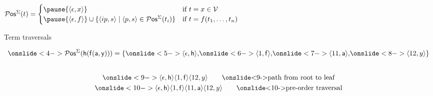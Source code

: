

\begin{definition}
$
	\Pos^\Sigma(t) =  
	\begin{cases}
\pause		\{ \ANGLES{\epsilon,x} \} & \text{if }t=x\in\SIGV \\
\pause		\{ \ANGLES{\epsilon, f} \} \cup \{ \ANGLES{ip,s}\mid \ANGLES{p,s} \in\Pos^\Sigma(t_i)\} &
		\text{if }t=f(t_1,\ldots,t_n)
	\end{cases}
$
\end{definition}

%
\pause
\begin{block}{Term traversals}

\begin{minipage}[c]{3cm}
\end{minipage}
%
\begin{minipage}[c]{8.5cm}
	\begin{gather*}
		\onslide<4->{
			\Pos^\Sigma(\mh(\mf(\ma,\my))) = \{ 
		\onslide<5->{ \ANGLES{\epsilon,\mh}, 
			}}
		\onslide<6->{ \ANGLES{1,\mf}, }
		\onslide<7->{ \ANGLES{11,\ma}, }
		\onslide<8->{ \ANGLES{12,y} }
		\} \\[2em]
		\onslide<9->{\ANGLES{\epsilon,\mh}\ANGLES{1,\mf}\ANGLES{12,y}
			\tag*{\onslide<9->{path from root to leaf}} 
		}			\\
		\onslide<10->{\ANGLES{\epsilon,\mh}\ANGLES{1,\mf}\ANGLES{11,\ma}\ANGLES{12,y}
			\tag*{\onslide<10->{pre-order traversal}} 
		}
		\\
		\\
		\\
	\end{gather*}
\end{minipage}
\end{block}
